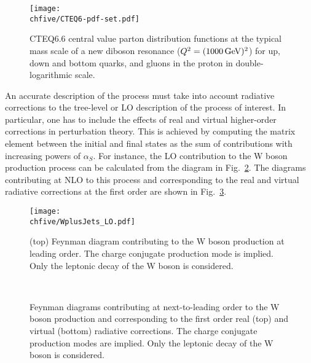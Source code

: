 \begin{figure}[!htb]
\centering
\texttt{[image: \\chfive/CTEQ6-pdf-set.pdf]}
\caption{CTEQ6.6 central value parton distribution functions at the typical mass scale of a new diboson resonance ($Q^2 = (1000\,\text{Ge\hspace{-.08em}V})^2$) for up, down and bottom quarks, and gluons in the proton in double-logarithmic scale.}
\label{fig:pdfs}
\end{figure}

An accurate description of the process must take into account radiative corrections to the tree-level or LO description of the process of interest.
In particular, one has to include the effects of real and virtual higher-order corrections in perturbation theory.
This is achieved by computing the matrix element between the initial and final states as the sum of contributions with increasing powers of $\alpha_S$.
For instance, the LO contribution to the W boson production process can be calculated from the diagram in Fig.~\ref{fig:wjetsFD_LO}.
The diagrams contributing at NLO to this process and corresponding to the real and virtual radiative corrections at the first order are shown in Fig.~\ref{fig:wjetsFD_NLO}.\\

\begin{figure}[!htb]
\centering
\texttt{[image: \\chfive/WplusJets\_LO.pdf]}
\caption{(top) Feynman diagram contributing to the W boson production at leading order. The charge conjugate production mode is implied. Only the leptonic decay of the W boson is considered.}
\label{fig:wjetsFD_LO}
\end{figure}

\begin{figure}[!htb]
\centering
{}
\\
\caption{Feynman diagrams contributing at next-to-leading order to the W boson production and corresponding to the first order real (top) and virtual (bottom) radiative corrections.
The charge conjugate production modes are implied. Only the leptonic decay of the W boson is considered.}
\label{fig:wjetsFD_NLO}
\end{figure}

